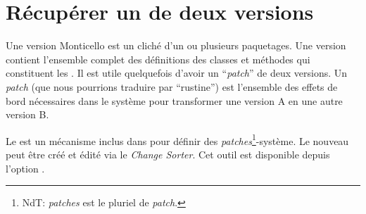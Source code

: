 \documentclass[a4paper,10pt,twoside]{book}
\begin{document}






\section{Récupérer un \changeset de deux versions}

Une version Monticello est un cliché d'un ou plusieurs paquetages. Une version contient l'ensemble complet des définitions des classes et méthodes qui constituent les .
Il est utile quelquefois d'avoir un ``\emph{patch}'' de deux versions. Un \emph{patch} (que nous pourrions traduire par ``rustine'') est l'ensemble des effets de bord nécessaires dans le système pour transformer une version A en une autre version B.

Le \changeset est un mécanisme inclus dans \pharo pour définir des \emph{patches}\footnote{NdT: \emph{patches} est le pluriel de \emph{patch}.}-système. Le nouveau \changeset peut être créé et édité via le \emph{Change Sorter}. Cet outil est disponible depuis l'option .
\end{document}
